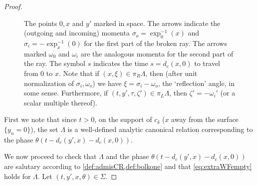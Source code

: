 \documentclass[
	fontsize=11pt, 
	twoside=false, 
	abstract=true, 
	a4paper,
]{scrartcl}
\begin{document}
\begin{proof}
\begin{figure}
	\caption{The points $0, x$ and $y'$ marked in space. The arrows indicate the (outgoing and incoming) momenta $\sigma_o = \exp_0^{-1}(x)$ and $\sigma_i = -\exp_x^{-1}(0)$ for the first part of the broken ray. The arrows marked $\omega_0$ and $\omega_i$ are the analogous momenta for the second part of the ray. The symbol $s$ indicates the time $s=d_c(x,0)$ to travel from $0$ to $x$. Note that if $(x,\xi) \in \pi_R \Lambda$, then (after unit normalization of $\sigma_i,\omega_o$) we have $\xi = \sigma_i-\omega_o$, the `reflection' angle, in some sense. Furthermore, if $(t,y',\tau,\zeta') \in \pi_L\Lambda$, then $\zeta'=-\omega_i'$ (or a scalar multiple thereof).}
	\label{fig:raypic}
\end{figure}


	First we note that since $t>0$, on the support of $c_\delta$ ($x$ away from the surface $\{y_n=0\}$), the set $\Lambda$ is a well-defined analytic canonical relation corresponding to the phase $\theta(t-d_c(y',x)-d_c(x,0))$.

	We now proceed to check that $\Lambda$ and the phase $\theta(t-d_c(y',x)-d_c(x,0))$ are salutary according to \cref{def:admisCR,def:bolkone} and that \cref{eq:extraWFempty} holds for $\Lambda$.  Let $(t,y',x,\theta)\in \Sigma$.


\end{proof}
\end{document}
